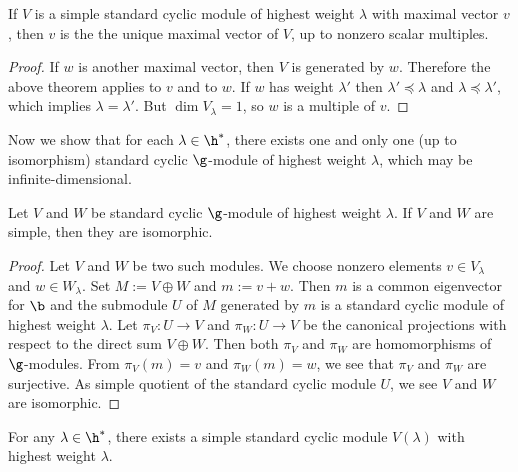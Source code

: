 \begin{corollary}
If $V$ is a simple standard cyclic module of highest weight $\lambda$ with maximal vector $v$, then $v$ is the the unique maximal vector of $V$, up to nonzero scalar multiples.
\end{corollary}
\begin{proof}
If $w$ is another maximal vector, then $V$ is generated by $w$. Therefore the above theorem applies to $v$ and to $w$. If $w$ has weight $\lambda'$ then $\lambda'\preceq\lambda$ and $\lambda\preceq\lambda'$, which implies $\lambda=\lambda'$. But $\dim V_\lambda=1$, so $w$ is a multiple of $v$.
\end{proof}
Now we show that for each $\lambda\in\h^*$, there exists one and only one (up to isomorphism) standard cyclic $\g$-module of highest weight $\lambda$, which may be infinite-dimensional.
\begin{theorem}\label{Lie algebra simple standard cyclic module isomorphic if highest weight}
Let $V$ and $W$ be standard cyclic $\g$-module of highest weight $\lambda$. If $V$ and $W$ are simple, then they are isomorphic. 
\end{theorem}
\begin{proof}
Let $V$ and $W$ be two such modules. We choose nonzero elements $v\in V_\lambda$ and $w\in W_\lambda$. Set $M:=V\oplus W$ and $m:=v+w$. Then $m$ is a common eigenvector for $\b$ and the submodule $U$ of $M$ generated by $m$ is a standard cyclic module of highest weight $\lambda$. Let $\pi_V:U\to V$ and $\pi_W:U\to V$ be the canonical projections with respect to the direct sum $V\oplus W$. Then both $\pi_V$ and $\pi_W$ are homomorphisms of $\g$-modules. From $\pi_V(m)=v$ and $\pi_W(m)=w$, we see that $\pi_V$ and $\pi_W$ are surjective. As simple quotient of the standard cyclic module $U$, we see $V$ and $W$ are isomorphic.
\end{proof}
\begin{theorem}
For any $\lambda\in\h^*$, there exists a simple standard cyclic module $V(\lambda)$ with highest weight $\lambda$.
\end{theorem}
